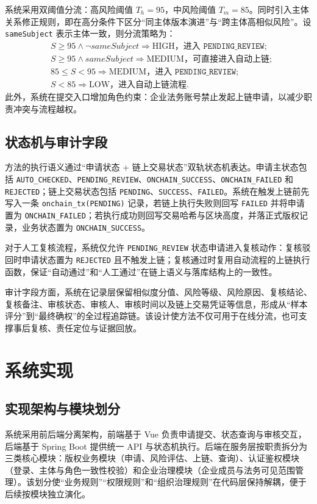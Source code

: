 \documentclass[UTF8,a4paper,zihao=5]{ctexart}
\begin{document}
系统采用双阈值分流：高风险阈值 $T_h=95$，中风险阈值 $T_m=85$。同时引入主体关系修正规则，即在高分条件下区分“同主体版本演进”与“跨主体高相似风险”。设 \texttt{sameSubject} 表示主体一致，则分流策略为：
\begin{align*}
&S \geq 95 \land \neg sameSubject \Rightarrow \text{HIGH，进入 } \texttt{PENDING\_REVIEW};\\
&S \geq 95 \land sameSubject \Rightarrow \text{MEDIUM，可直接进入自动上链};\\
&85 \leq S < 95 \Rightarrow \text{MEDIUM，进入 } \texttt{PENDING\_REVIEW};\\
&S < 85 \Rightarrow \text{LOW，进入自动上链流程}.
\end{align*}
此外，系统在提交入口增加角色约束：企业法务账号禁止发起上链申请，以减少职责冲突与流程越权。

\subsection{状态机与审计字段}
方法的执行语义通过“申请状态 + 链上交易状态”双轨状态机表达。申请主状态包括 \texttt{AUTO\_CHECKED}、\texttt{PENDING\_REVIEW}、\texttt{ONCHAIN\_SUCCESS}、\texttt{ONCHAIN\_FAILED} 和 \texttt{REJECTED}；链上交易状态包括 \texttt{PENDING}、\texttt{SUCCESS}、\texttt{FAILED}。系统在触发上链前先写入一条 \texttt{onchain\_tx(PENDING)} 记录，若链上执行失败则回写 \texttt{FAILED} 并将申请置为 \texttt{ONCHAIN\_FAILED}；若执行成功则回写交易哈希与区块高度，并落正式版权记录，业务状态置为 \texttt{ONCHAIN\_SUCCESS}。

对于人工复核流程，系统仅允许 \texttt{PENDING\_REVIEW} 状态申请进入复核动作：复核驳回时申请状态置为 \texttt{REJECTED} 且不触发上链；复核通过时复用自动流程的上链执行函数，保证“自动通过”和“人工通过”在链上语义与落库结构上的一致性。

审计字段方面，系统在记录层保留相似度分值、风险等级、风险原因、复核结论、复核备注、审核状态、审核人、审核时间以及链上交易凭证等信息，形成从“样本评分”到“最终确权”的全过程追踪链。该设计使方法不仅可用于在线分流，也可支撑事后复核、责任定位与证据回放。

\section{系统实现}
\begingroup
\sloppy
\setlength{\emergencystretch}{2em}
\subsection{实现架构与模块划分}
系统采用前后端分离架构，前端基于 Vue 负责申请提交、状态查询与审核交互，后端基于 Spring Boot 提供统一 API 与状态机执行。后端在服务层按职责拆分为三类核心模块：版权业务模块（申请、风险评估、上链、查询）、认证鉴权模块（登录、主体与角色一致性校验）和企业治理模块（企业成员与法务可见范围管理）。该划分使“业务规则”“权限规则”和“组织治理规则”在代码层保持解耦，便于后续按模块独立演化。
\end{document}
